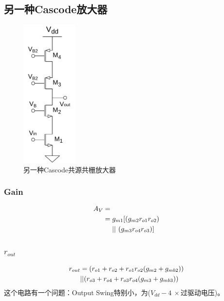 \documentclass[twoside,a4paper,openright,titlepage,draft]{ctexrep}
\begin{document}
\subsection{另一种Cascode放大器}
\begin{multicols}{2}
    \begin{figure}[H]
        \centering
        \includegraphics[height=75mm]{another.drawio.pdf}
        \caption{另一种Cascode共源共栅放大器}
        \label{fig:another}
    \end{figure}
    \columnbreak
    \subsubsection{Gain}
    \begin{align}
        A_V&=\notag \\
        &= g_{m1}[(g_{m2}r_{o1}r_{o2})\notag \\
            &\ \ \ \ ||\ (g_{m3}r_{o4}r_{o3})]
    \end{align}
    \subsubsection{$r_{out}$}
    \begin{align}
        r_{out}&= (r_{o1}+r_{o2}+r_{o1}r_{o2}(g_{m2}+g_{mb2})) \notag \\
        &||(r_{o3}+r_{o4}+r_{o3}r_{o4}(g_{m3}+g_{mb3})) \notag
    \end{align}
    这个电路有一个问题：Output Swing特别小，为($V_{dd} - 4\ \times$过驱动电压)。
\end{multicols}
\end{document}
